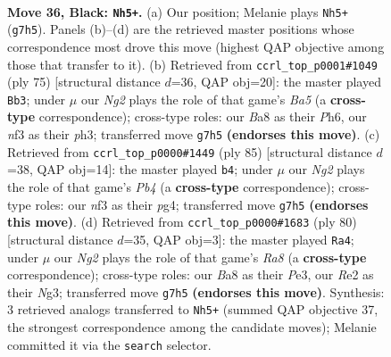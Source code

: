 \documentclass[11pt]{article}
\begin{document}
\clearpage

\begin{figure}[p]\centering
\begin{subfigure}{0.46\textwidth}\centering
\resizebox{\linewidth}{!}{%
\newchessgame
\chessboard[
  setfen={b4k2/P4pn1/6p1/4P3/5K2/R3NN1P/4r3/8 b - - 8 36},
  showmover=false,
  pgfstyle=straightmove, color=movearrow, markmove={g7-h5}
]}
\caption{}
\end{subfigure}\hfill
\begin{subfigure}{0.46\textwidth}\centering
\resizebox{\linewidth}{!}{%
\newchessgame
\chessboard[
  setfen={6k1/5p2/6pp/2RN4/bP1r4/7P/5PP1/6K1 b - - 2 38},
  showmover=false,
  pgfstyle=straightmove, color=movearrow, markmove={a4-b3}
]}
\caption{}
\end{subfigure}
\\[4pt]
\begin{subfigure}{0.46\textwidth}\centering
\resizebox{\linewidth}{!}{%
\newchessgame
\chessboard[
  setfen={6k1/5p2/5bp1/1p6/5PP1/3RP3/2r1N3/5K2 b - - 0 43},
  showmover=false,
  pgfstyle=straightmove, color=movearrow, markmove={b5-b4}
]}
\caption{}
\end{subfigure}\hfill
\begin{subfigure}{0.46\textwidth}\centering
\resizebox{\linewidth}{!}{%
\newchessgame
\chessboard[
  setfen={R7/4kp2/5np1/4r3/4p3/4P1NP/5P1K/8 w - - 4 41},
  showmover=false,
  pgfstyle=straightmove, color=movearrow, markmove={a8-a4}
]}
\caption{}
\end{subfigure}
\caption{\textbf{Move 36, Black: \texttt{Nh5+}.} (a) Our position; Melanie plays \texttt{Nh5+} (\texttt{g7h5}). Panels (b)--(d) are the retrieved master positions whose correspondence most drove this move (highest QAP objective among those that transfer to it). (b) Retrieved from \texttt{ccrl\_top\_p0001\#1049} (ply 75) [structural distance $d$=36, QAP obj=20]: the master played \texttt{Bb3}; under $\mu$ our \emph{Ng2} plays the role of that game's \emph{Ba5} (a \textbf{cross-type} correspondence); cross-type roles: our \emph{B}a8 as their \emph{P}h6, our \emph{n}f3 as their \emph{p}h3; transferred move \texttt{g7h5} \textbf{(endorses this move)}. (c) Retrieved from \texttt{ccrl\_top\_p0000\#1449} (ply 85) [structural distance $d$=38, QAP obj=14]: the master played \texttt{b4}; under $\mu$ our \emph{Ng2} plays the role of that game's \emph{Pb4} (a \textbf{cross-type} correspondence); cross-type roles: our \emph{n}f3 as their \emph{p}g4; transferred move \texttt{g7h5} \textbf{(endorses this move)}. (d) Retrieved from \texttt{ccrl\_top\_p0000\#1683} (ply 80) [structural distance $d$=35, QAP obj=3]: the master played \texttt{Ra4}; under $\mu$ our \emph{Ng2} plays the role of that game's \emph{Ra8} (a \textbf{cross-type} correspondence); cross-type roles: our \emph{B}a8 as their \emph{P}e3, our \emph{R}e2 as their \emph{N}g3; transferred move \texttt{g7h5} \textbf{(endorses this move)}. Synthesis: 3 retrieved analogs transferred to \texttt{Nh5+} (summed QAP objective 37, the strongest correspondence among the candidate moves); Melanie committed it via the \texttt{search} selector.}
\label{fig:thought-m71}
\end{figure}
\end{document}

